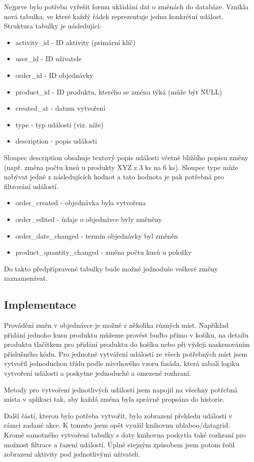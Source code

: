 Nejprve bylo potřeba vyřešit formu ukládání dat o změnách do databáze. Vznikla nová tabulka, ve které každý řádek reprezentuje jednu konkrétní událost. Struktura tabulky je následující:

\begin{itemize}
    \item activity\_id - ID aktivity (primární klíč)
    \item user\_id - ID uživatele
    \item order\_id - ID objednávky
    \item product\_id - ID produktu, kterého se změna týká (může být NULL)
    \item created\_at - datum vytvoření
    \item type - typ události (viz. níže)
    \item description - popis události
\end{itemize}

Sloupec description obsahuje textový popis události včetně bližšího popisu změny (např. změna počtu kusů u produkty XYZ z 3 ks na 6 ks). Sloupec type může nabývat jedné z následujících hodnot a tato hodnota je pak potřebná pro filtrování událostí.

\begin{itemize}
    \item order\_created - objednávka byla vytvořena
    \item order\_edited - údaje o objednávce byly změněny
    \item order\_date\_changed - termín objednávky byl změněn
    \item product\_quantity\_changed - změna počtu kusů u položky
\end{itemize}

Do takto předpřipravené tabulky bude možné jednoduše veškeré změny zaznamenávat.

\subsection{Implementace}

Provádění změn v objednávce je možné z několika různých míst. Například přidání jednoho kusu produktu můžeme provést buďto přímo v košíku, na detailu produktu tlačítkem pro přidání produktu do košíku nebo při výdeji naskenováním příslušného kódu. Pro jednotné vytváření událostí ze všech potřebných míst jsem vytvořil jednoduchou třídu podle návrhového vzoru fasáda, která zabalí logiku vytvoření události a poskytne jednoduché a omezené rozhraní. \cite{refactoringFacadeDesign}

Metody pro vytvoření jednotlivých událostí jsem napojil na všechny potřebná místa v aplikaci tak, aby každá změna byla správně propsána do historie.

Další částí, kterou bylo potřeba vytvořit, bylo zobrazení přehledu událostí v rámci zadané akce. K tomuto jsem opět využil knihovnu ublaboo/datagrid. \cite{contributteContributteDatagrid} Kromě samotného vytvoření tabulky s daty knihovna poskytla také rozhraní pro možnost filtrace a řazení událostí. Úplně stejným způsobem jsem potom řešil zobrazení aktivity pod jednotlivými uživateli. 
